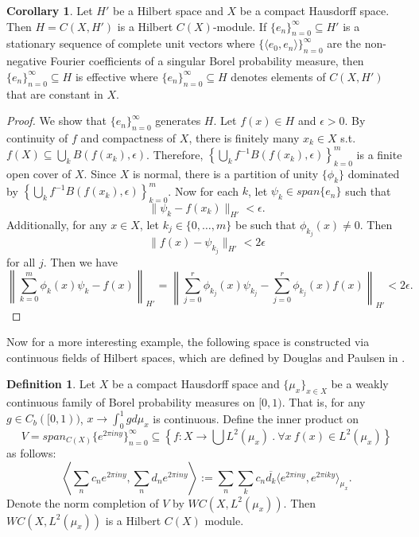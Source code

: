 \documentclass[11pt]{amsart}
\theoremstyle{definition}
\newtheorem{defn}[thm]{Definition}
\newtheorem{cor}{Corollary}[section]
\numberwithin{equation}{section}
\begin{document}
\begin{cor}\label{uniformkacz}
Let $H'$ be a Hilbert space and $X$ be a compact Hausdorff space. Then $H=C(X,H')$ is a Hilbert $C(X)$-module. If $\{e_{n}\}_{n=0}^{\infty}\subseteq H'$ is a stationary sequence of complete unit vectors where $\{\langle e_{0}, e_{n}\rangle\}_{n=0}^{\infty}$ are the non-negative Fourier coefficients of a singular Borel probability measure, then $\{e_{n}\}_{n=0}^{\infty}\subseteq H$ is effective where $\{e_{n}\}_{n=0}^{\infty}\subseteq H$ denotes elements of $C(X,H')$ that are constant in $X$.
\end{cor}
\begin{proof}
We show that $\{e_{n}\}_{n=0}^{\infty}$ generates $H$. Let $f(x)\in H$ and $\epsilon>0$. By continuity of $f$ and compactness of $X$, there is finitely many $x_{k}\in X$ s.t. $f(X)\subseteq \bigcup_{k}B(f(x_{k}),\epsilon)$. Therefore, $\left\{\bigcup_{k}f^{-1}B(f(x_{k}),\epsilon) \right\}_{k=0}^{m}$ is a finite open cover of $X$. Since $X$ is normal, there is a partition of unity $\{\phi_{k}\}$ dominated by $\left\{\bigcup_{k}f^{-1}B(f(x_{k}),\epsilon) \right\}_{k=0}^{m}$. Now for each $k$, let $\psi_{k}\in span\{e_{n}\}$ such that
$$\|\psi_{k}-f(x_{k})\|_{H'}<\epsilon.$$
Additionally, for any $x\in X$, let $k_{j}\in \{0,\dots, m\}$ be such that $\phi_{k_{j}}(x)\neq 0$. Then $$\|f(x)-\psi_{k_{j}}\|_{H'}<2\epsilon$$ for all $j$.
Then we have
$$\left\|\sum_{k=0}^{m}\phi_{k}(x)\psi_{k}-f(x) \right\|_{H'}=\left\|\sum_{j=0}^{r}\phi_{k_{j}}(x)\psi_{k_{j}}-\sum_{j=0}^{r}\phi_{k_{j}}(x)f(x) \right\|_{H'}< 2\epsilon.$$
\end{proof}

Now for a more interesting example, the following space is constructed via continuous fields of Hilbert spaces, which are defined by Douglas and Paulsen in \cite{Douglas1989Hilbert}.

\begin{defn}
Let $X$ be a compact Hausdorff space and $\{\mu_{x}\}_{x\in X}$ be a weakly continuous family of Borel probability measures on $[0,1)$. That is, for any $g\in C_{b}([0,1))$, $x\to \int_{0}^{1}gd\mu_{x}$ is continuous.
Define the inner product on $$V=span_{C(X)}\{e^{2\pi i ny}\}_{n=0}^{\infty}\subseteq \left\{f:X \to \bigcup L^{2}(\mu_{x}) \ . \ \forall x\ f(x)\in L^{2}(\mu_{x}) \right\}$$ as follows:
$$\left\langle \sum_{n}c_{n}e^{2\pi i ny},\sum_{n}d_{n}e^{2\pi i ny} \right\rangle:=\sum_{n}\sum_{k}c_{n}\overline{d_{k}}\langle e^{2\pi i ny}, e^{2\pi i ky}\rangle_{\mu_{x}}. $$
Denote the norm completion of $V$ by $WC(X, L^{2}(\mu_{x}))$. Then $WC(X, L^{2}(\mu_{x}))$ is a Hilbert $C(X)$ module.    
\end{defn}
\end{document}
